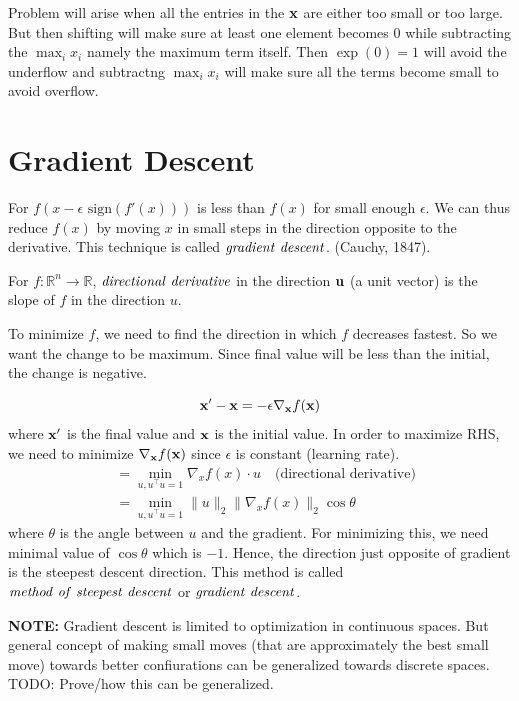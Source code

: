 \documentclass[12pt,reqno]{amsart}
\theoremstyle{plain}
\theoremstyle{definition}
\begin{document}
Problem will arise when all the entries in the \(\bf x\) are either too
small or too large. But then shifting will make sure at least one
element becomes \(0\) while subtracting the \(\max_ix_i\) namely the
maximum term itself. Then \(\exp{(0)} = 1\) will avoid the underflow and
subtractng \(\max_ix_i\) will make sure all the terms become small to
avoid overflow.

\section{Gradient Descent}\label{gradient-descent}
For \(f(x - \epsilon \text{ sign}(f'(x)))\) is less than \(f(x)\) for
small enough \(\epsilon\). We can thus reduce \(f(x)\) by moving \(x\)
in small steps in the direction opposite to the derivative. This
technique is called \({\it gradient~descent}\). (Cauchy, 1847).

For \(f: {\mathbb R}^n \to {\mathbb R}\),
\({\it directional~derivative}\) in the direction \({\bf u}\) (a unit
vector) is the slope of \(f\) in the direction \(u\).

To minimize \(f\), we need to find the direction in which \(f\)
decreases fastest. So we want the change to be maximum. Since final
value will be less than the initial, the change is negative.

\[ {\bf x}' - {\bf x} = - \epsilon\nabla_{{\bf x}} f({\bf x}) \] where
\({\bf x}'\) is the final value and \({\bf x}\) is the initial value. In
order to maximize RHS, we need to minimize
\(\nabla_{{\bf x}}f({\bf x})\) since \(\epsilon\) is constant (learning
rate).
\begin{align*}
    &= \min\limits_{u, u^\top u=1} \nabla_xf(x) \cdot u \quad \text{(directional derivative)} \\
    &= \min\limits_{u, u^\top u=1} \| u\|_2 \|\nabla_x f(x)\|_2 \cos \theta
\end{align*}
where \(\theta\) is the angle between \(u\) and the gradient. For minimizing this, we need minimal value of \(\cos\theta\) which is \(-1\). Hence, the direction just opposite of gradient is the steepest descent direction. This method is called \({ \it method~of~steepest~descent}\) or \({\it gradient~descent}\).

\textbf{NOTE:} Gradient descent is limited to optimization in continuous
spaces. But general concept of making small moves (that are
approximately the best small move) towards better confiurations can be
generalized towards discrete spaces. TODO: Prove/how this can be
generalized.
\end{document}
